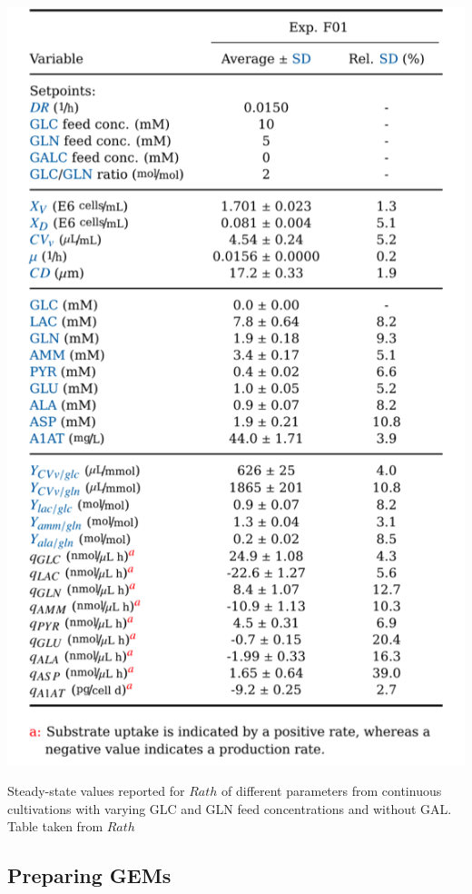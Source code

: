 \documentclass[]{article}
\begin{document}
 	\begin{table}
 		\centering
 		\includegraphics[scale = 0.8]{Table_4_12}
 		\caption{Steady-state values reported for $Rath$ of different parameters from continuous cultivations with varying GLC and GLN feed concentrations and without GAL. Table taken from $Rath$}
 	
 	\end{table}

\subsection{Preparing GEMs} %
	
\end{document}
